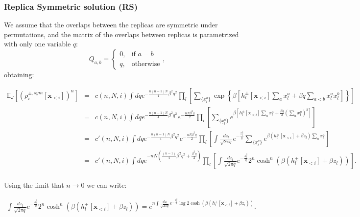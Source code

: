 \documentclass[aps,physrev,10pt,floatfix,longbibliography,nofootinbib,reprint]{revtex4-2}
\begin{document}
\subsubsection{Replica Symmetric solution (RS)}
We assume that the overlaps between the replicas are symmetric under permutations, and the matrix of the overlaps between replicas is parametrized with only one variable $q$:
$$
Q_{a,b}=\begin{cases}
			0, & \text{if $a=b$}\\
            q, & \text{otherwise}
		 \end{cases},
$$
obtaining:
\begin{widetext}
\begin{eqnarray}
\mathbb{E}_{\underline{J}}\left[(\rho_i^{\pm, sym}[\mathbf{x}_{<i}])^n \right] & = & 
c(n,N,i)
\int dq e^{-\frac{n(n-1)N}{4}\beta^2 q^2}
\prod_{l} \left[
\sum_{\{\underline{x}^{a}_l\}} 
\exp\left\{\beta \left[
h_l^{\pm}[\mathbf{x}_{<i}] \sum_{a} x_l^{a} +\beta q \sum_{a<b} x_l^{a} x_l^{b} \right]  \right\} 
\right] \\
& = &
c(n,N,i)
\int dq e^{-\frac{n(n-1)N}{4}\beta^2 q^2}
e^{-\frac{nN\beta^2 q}{2}}
\prod_{l} \left[
\sum_{\{\underline{x}^{a}_l\}} 
e^{\beta \left[
h_l^{\pm}[\mathbf{x}_{<i}] \sum_{a} x_l^{a} + \frac{\beta q}{2} \left(\sum_{a} x_l^{a} \right)^2 \right]} 
\right]\\
& = &
c'(n,N,i)
\int dq e^{-\frac{n(n-1)N}{4}\beta^2 q^2}
e^{-\frac{nN\beta^2 q}{2}}
\prod_{l} \left[\int \frac{dz_l}{\sqrt{2\pi q}} e^{-\frac{z_l^2}{q}}
\sum_{\{\underline{x}^{a}_l\}} 
e^{\beta \left(
h_l^{\pm}[\mathbf{x}_{<i}] +\beta z_l \right) \sum_{a} x_l^{a}} 
\right]\\
& = &
c'(n,N,i)
\int dq e^{-nN\left(\frac{(n-1)}{4}\beta^2 q^2 +\frac{\beta^2 q}{2}\right)}
\prod_{l} \left[\int \frac{dz_l}{\sqrt{2\pi q}} e^{-\frac{z_l^2}{q}}
2^n\cosh^n \left(\beta \left(
h_l^{\pm}[\mathbf{x}_{<i}] +\beta z_l \right)\right) 
\right].\\
\end{eqnarray}
\end{widetext}
Using the limit that $n\rightarrow 0$ we can write:
\begin{widetext}
\begin{eqnarray}
\int \frac{dz_l}{\sqrt{2\pi q}} e^{-\frac{z_l^2}{q}}
2^n\cosh^n \left(\beta \left(
h_l^{\pm}[\mathbf{x}_{<i}] +\beta z_l \right)\right) = e^{n \int \frac{dz_l}{\sqrt{2\pi q}} e^{-\frac{z_l^2}{q}}
\log 2\cosh \left(\beta \left(
h_l^{\pm}[\mathbf{x}_{<i}] +\beta z_l \right)\right)}.
\label{eq:gauss_n0}
\end{eqnarray}
\end{widetext}
\end{document}
